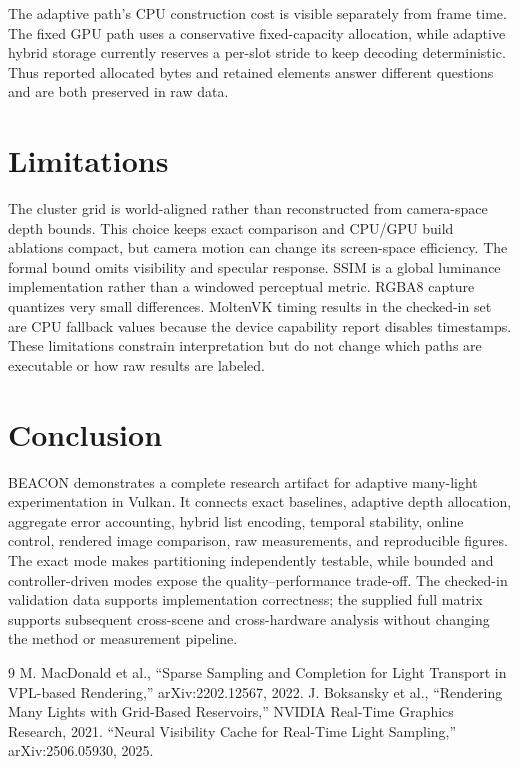 \documentclass[10pt,twocolumn]{article}
\begin{document}
The adaptive path's CPU construction cost is visible separately from frame time. The fixed GPU path
uses a conservative fixed-capacity allocation, while adaptive hybrid storage currently reserves a
per-slot stride to keep decoding deterministic. Thus reported allocated bytes and retained elements
answer different questions and are both preserved in raw data.

\section{Limitations}
The cluster grid is world-aligned rather than reconstructed from camera-space depth bounds. This
choice keeps exact comparison and CPU/GPU build ablations compact, but camera motion can change its
screen-space efficiency. The formal bound omits visibility and specular response. SSIM is a global
luminance implementation rather than a windowed perceptual metric. RGBA8 capture quantizes very
small differences. MoltenVK timing results in the checked-in set are CPU fallback values because the
device capability report disables timestamps. These limitations constrain interpretation but do not
change which paths are executable or how raw results are labeled.

\section{Conclusion}
BEACON demonstrates a complete research artifact for adaptive many-light experimentation in Vulkan.
It connects exact baselines, adaptive depth allocation, aggregate error accounting, hybrid list
encoding, temporal stability, online control, rendered image comparison, raw measurements, and
reproducible figures. The exact mode makes partitioning independently testable, while bounded and
controller-driven modes expose the quality--performance trade-off. The checked-in validation data
supports implementation correctness; the supplied full matrix supports subsequent cross-scene and
cross-hardware analysis without changing the method or measurement pipeline.

\begin{thebibliography}{9}
 M. MacDonald et al., ``Sparse Sampling and Completion for Light Transport in
VPL-based Rendering,'' arXiv:2202.12567, 2022.
 J. Boksansky et al., ``Rendering Many Lights with Grid-Based Reservoirs,'' NVIDIA
Real-Time Graphics Research, 2021.
 ``Neural Visibility Cache for Real-Time Light Sampling,'' arXiv:2506.05930, 2025.
\end{thebibliography}
\end{document}
